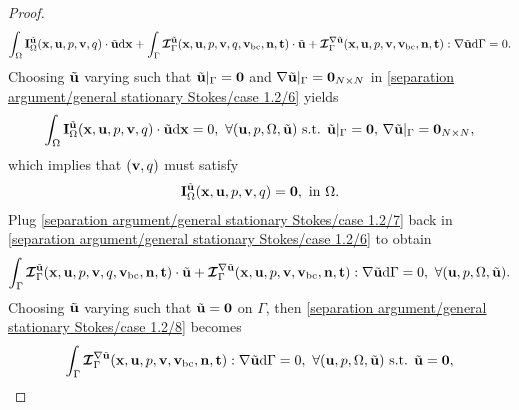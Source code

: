 \documentclass[oneside,11pt]{book}
\numberwithin{equation}{section}
\begin{document}
\begin{enumerate}[leftmargin=0mm]
\begin{itemize}[leftmargin=0in]
\begin{proof}
            \begin{align}
                \label{separation argument/general stationary Stokes/case 1.2/6}
                \int_\Omega {\bf I}_\Omega^{\tilde{\bf u}}({\bf x},{\bf u},p,{\bf v},q)\cdot\tilde{\bf u}{\rm d}{\bf x} + \int_\Gamma \boldsymbol{\mathcal{I}}_\Gamma^{\tilde{\bf u}}({\bf x},{\bf u},p,{\bf v},q,{\bf v}_{\rm bc},{\bf n},{\bf t})\cdot\tilde{\bf u} + \boldsymbol{\mathcal{I}}_\Gamma^{\nabla\tilde{\bf u}}({\bf x},{\bf u},p,{\bf v},{\bf v}_{\rm bc},{\bf n},{\bf t}):\nabla\tilde{\bf u}{\rm d}\Gamma = 0.
            \end{align}
            Choosing $\tilde{\bf u}$ varying such that $\tilde{\bf u}|_\Gamma = {\bf 0}$ and $\nabla\tilde{\bf u}|_\Gamma = {\bf 0}_{N\times N}$ in \eqref{separation argument/general stationary Stokes/case 1.2/6} yields
            \begin{align*}
                \int_\Omega {\bf I}_\Omega^{\tilde{\bf u}}({\bf x},{\bf u},p,{\bf v},q)\cdot\tilde{\bf u}{\rm d}{\bf x} = 0,\ \forall({\bf u},p,\Omega,\tilde{\bf u})\mbox{ s.t. }\tilde{\bf u}|_\Gamma = {\bf 0},\,\nabla\tilde{\bf u}|_\Gamma = {\bf 0}_{N\times N},
            \end{align*}
            which implies that $({\bf v},q)$ must satisfy
            \begin{align}
                \label{separation argument/general stationary Stokes/case 1.2/7}
                {\bf I}_\Omega^{\tilde{\bf u}}({\bf x},{\bf u},p,{\bf v},q) = {\bf 0},\mbox{ in }\Omega.
            \end{align}
            Plug \eqref{separation argument/general stationary Stokes/case 1.2/7} back in \eqref{separation argument/general stationary Stokes/case 1.2/6} to obtain
            \begin{align}
                \label{separation argument/general stationary Stokes/case 1.2/8}
                \int_\Gamma \boldsymbol{\mathcal{I}}_\Gamma^{\tilde{\bf u}}({\bf x},{\bf u},p,{\bf v},q,{\bf v}_{\rm bc},{\bf n},{\bf t})\cdot\tilde{\bf u} + \boldsymbol{\mathcal{I}}_\Gamma^{\nabla\tilde{\bf u}}({\bf x},{\bf u},p,{\bf v},{\bf v}_{\rm bc},{\bf n},{\bf t}):\nabla\tilde{\bf u}{\rm d}\Gamma = 0,\ \forall({\bf u},p,\Omega,\tilde{\bf u}).
            \end{align}
            Choosing $\tilde{\bf u}$ varying such that $\tilde{\bf u} = {\bf 0}$ on $\Gamma$, then \eqref{separation argument/general stationary Stokes/case 1.2/8} becomes
            \begin{align*}
                \int_\Gamma \boldsymbol{\mathcal{I}}_\Gamma^{\nabla\tilde{\bf u}}({\bf x},{\bf u},p,{\bf v},{\bf v}_{\rm bc},{\bf n},{\bf t}):\nabla\tilde{\bf u}{\rm d}\Gamma = 0,\ \forall({\bf u},p,\Omega,\tilde{\bf u})\mbox{ s.t. }\tilde{\bf u} = {\bf 0},

\end{align*}
\end{proof}
\end{itemize}
\end{enumerate}
\end{document}
